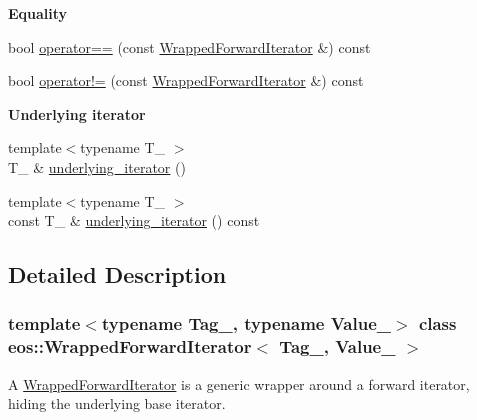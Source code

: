 \begin{Indent}{\bf Equality}\par
{\em \label{_amgrp890ebf2ce6beb154deb673b3af2d03d4}
 }\begin{DoxyCompactItemize}
\item 
bool \hyperlink{classeos_1_1WrappedForwardIterator_a79398c29c6f5012a3c882db8cf61d091}{operator==} (const \hyperlink{classeos_1_1WrappedForwardIterator}{WrappedForwardIterator} \&) const 
\item 
bool \hyperlink{classeos_1_1WrappedForwardIterator_a5fb87c43d4ca1c5a0ceffd97b4a4fc78}{operator!=} (const \hyperlink{classeos_1_1WrappedForwardIterator}{WrappedForwardIterator} \&) const 
\end{DoxyCompactItemize}
\end{Indent}
\begin{Indent}{\bf Underlying iterator}\par
{\em \label{_amgrp36bf725d6e562a796de32e509b9c2169}
 }\begin{DoxyCompactItemize}
\item 
{\footnotesize template$<$typename T\_\- $>$ }\\T\_\- \& \hyperlink{classeos_1_1WrappedForwardIterator_a5dd5d4d179b339a647660a0e4289a67c}{underlying\_\-iterator} ()
\item 
{\footnotesize template$<$typename T\_\- $>$ }\\const T\_\- \& \hyperlink{classeos_1_1WrappedForwardIterator_a41c259a3f5e5d206c87ecb9dfeb41dec}{underlying\_\-iterator} () const 
\end{DoxyCompactItemize}
\end{Indent}


\subsection{Detailed Description}
\subsubsection*{template$<$typename Tag\_\-, typename Value\_\-$>$ class eos::WrappedForwardIterator$<$ Tag\_\-, Value\_\- $>$}

A \hyperlink{classeos_1_1WrappedForwardIterator}{WrappedForwardIterator} is a generic wrapper around a forward iterator, hiding the underlying base iterator. 

